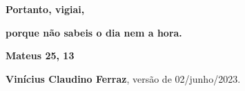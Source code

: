 \documentclass{rbfin}
\begin{document}
\shorttitle{$\,$} %
\rbfe{}
\autor{$\,$}

$\,$

\vspace{40mm}

\Huge

\begin{center}
\textbf{Portanto, vigiai,}

\textbf{porque não sabeis o dia nem a hora.}

\textbf{Mateus 25, 13}

\end{center}

\vspace{90mm}

\Large

\begin{flushright}
\textbf{Vinícius Claudino Ferraz}, versão de 02/junho/2023.
\end{flushright}

\LARGE

\newpage

\doublespacing
\end{document}
